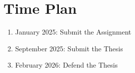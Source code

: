 \documentclass{article}
\begin{document}
	\section{Time Plan}
	\begin{enumerate}
		\item January 2025: Submit the Assignment
		\item September 2025: Submit the Thesis
		\item February 2026: Defend the Thesis
	\end{enumerate}
\end{document}
